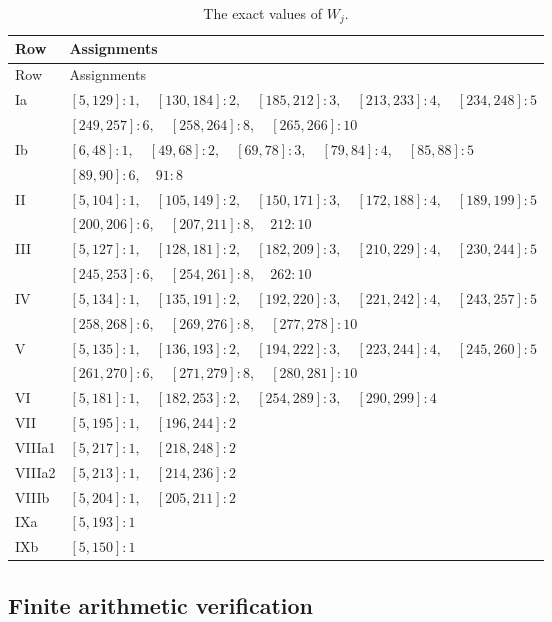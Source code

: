 \begin{longtable}{@{}lp{}@{}}
\caption{The exact values of $W_j$.}\label{bc:W-table}\\
\toprule Row&Assignments\\\midrule\endfirsthead
\toprule Row&Assignments\\\midrule\endhead
Ia & $[5,129]:1,\quad [130,184]:2,\quad [185,212]:3,\quad [213,233]:4,\quad [234,248]:5$\\
 & $[249,257]:6,\quad [258,264]:8,\quad [265,266]:10$\\
Ib & $[6,48]:1,\quad [49,68]:2,\quad [69,78]:3,\quad [79,84]:4,\quad [85,88]:5$\\
 & $[89,90]:6,\quad 91:8$\\
II & $[5,104]:1,\quad [105,149]:2,\quad [150,171]:3,\quad [172,188]:4,\quad [189,199]:5$\\
 & $[200,206]:6,\quad [207,211]:8,\quad 212:10$\\
III & $[5,127]:1,\quad [128,181]:2,\quad [182,209]:3,\quad [210,229]:4,\quad [230,244]:5$\\
 & $[245,253]:6,\quad [254,261]:8,\quad 262:10$\\
IV & $[5,134]:1,\quad [135,191]:2,\quad [192,220]:3,\quad [221,242]:4,\quad [243,257]:5$\\
 & $[258,268]:6,\quad [269,276]:8,\quad [277,278]:10$\\
V & $[5,135]:1,\quad [136,193]:2,\quad [194,222]:3,\quad [223,244]:4,\quad [245,260]:5$\\
 & $[261,270]:6,\quad [271,279]:8,\quad [280,281]:10$\\
VI & $[5,181]:1,\quad [182,253]:2,\quad [254,289]:3,\quad [290,299]:4$\\
VII & $[5,195]:1,\quad [196,244]:2$\\
VIIIa1 & $[5,217]:1,\quad [218,248]:2$\\
VIIIa2 & $[5,213]:1,\quad [214,236]:2$\\
VIIIb & $[5,204]:1,\quad [205,211]:2$\\
IXa & $[5,193]:1$\\
IXb & $[5,150]:1$\\
\bottomrule\end{longtable}

\subsection{Finite arithmetic verification}
\label{bc:arithmetic}

